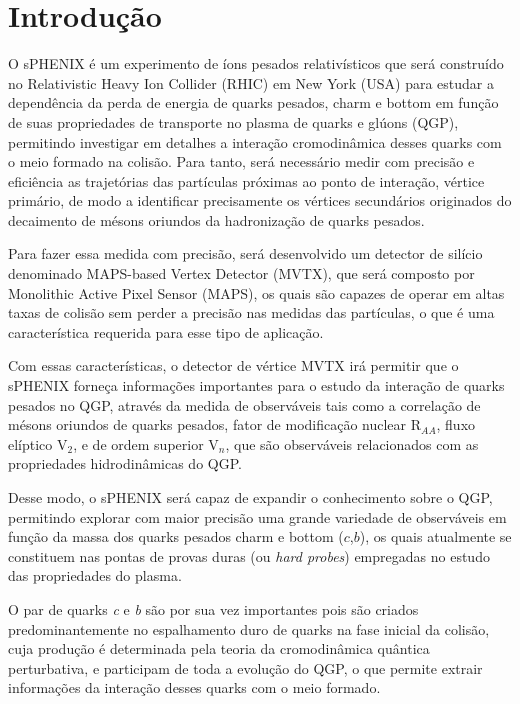 \chapter{Introdução}

O sPHENIX é um experimento de íons pesados relativísticos que será construído no Relativistic Heavy Ion Collider (RHIC) em New York (USA) para estudar a dependência da perda de energia de quarks pesados, charm e bottom em função de suas propriedades de transporte no plasma de quarks e glúons (QGP), permitindo investigar em detalhes a interação cromodinâmica desses quarks com o meio formado na colisão. Para tanto, será necessário medir com precisão e eficiência as trajetórias das partículas próximas ao ponto de interação, vértice primário, de modo a identificar precisamente os vértices secundários originados do decaimento de mésons oriundos da hadronização de quarks pesados.

Para fazer essa medida com precisão, será desenvolvido um detector de silício denominado MAPS-based Vertex Detector (MVTX), que será composto por Monolithic Active Pixel Sensor (MAPS), os quais são capazes de operar em altas taxas de colisão sem perder a precisão nas medidas das partículas, o que é uma característica requerida para esse tipo de aplicação.    

Com essas características, o detector de vértice MVTX irá permitir que o sPHENIX forneça informações importantes para o estudo da interação de quarks pesados no QGP, através da medida de observáveis tais como a correlação de mésons oriundos de quarks pesados, fator de modificação nuclear R$_{AA}$, fluxo elíptico V$_{2}$, e de ordem superior V$_{n}$, que são observáveis relacionados com as propriedades hidrodinâmicas do QGP.

Desse modo, o sPHENIX será capaz de expandir o conhecimento sobre o QGP, permitindo explorar com maior precisão uma grande variedade de observáveis em função da massa dos quarks pesados charm e bottom ($c$,$b$), os quais atualmente se constituem nas pontas de provas duras (ou \textit{hard probes}) empregadas no estudo das propriedades do plasma.

O par de quarks \textit{c} e \textit{b} são por sua vez importantes pois são criados predominantemente no espalhamento duro de quarks na fase inicial da colisão, cuja produção é determinada pela teoria da cromodinâmica quântica perturbativa, e participam de toda a evolução do QGP, o que permite extrair informações da interação desses quarks com o meio formado.

